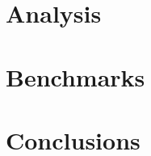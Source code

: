 \documentclass[sigchi,authordraft]{acmart}
\begin{document}
    \section{Analysis}
    \label{sec:analysis}
    

    \section{Benchmarks}
    \label{sec:benchmarks}
    

    \section{Conclusions}
    \label{sec:conclusions}
    

    
    
\end{document}
